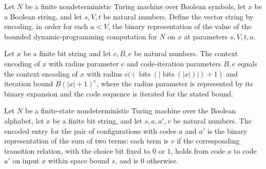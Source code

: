 \begin{definition}
\label{Randomized.BPLInP.vecW}
\leanok
{}
Let $N$ be a finite nondeterministic Turing machine over Boolean symbols, let $x$ be a
Boolean string, and let $s,V,t$ be natural numbers. Define the vector string by
encoding, in order for each $a<V$, the binary representation of the value of the bounded
dynamic-programming computation for $N$ on $x$ at parameters $s,V,t,a$.
\end{definition}

\begin{theorem}
\label{Randomized.BPLInP.ctxW_eq}
\leanok
{}
Let $x$ be a finite bit string and let $c,B,e$ be natural numbers. The context encoding
of $x$ with radius parameter $c$ and code-iteration parameters $B,e$ equals the context
encoding of $x$ with radius $c((\operatorname{bits}( |\operatorname{bits}(|x|)|)+1)$ and
iteration bound $B(|x|+1)^e$, where the radius parameter is represented by its binary
expansion and the code sequence is iterated for the stated bound.
\end{theorem}

\begin{theorem}
\label{Randomized.BPLInP.entryW_eq}
\leanok
{}
Let $N$ be a finite-state nondeterministic Turing machine over the Boolean alphabet, let
$x$ be a finite bit string, and let $s,a,a',v$ be natural numbers. The encoded entry for
the pair of configurations with codes $a$ and $a'$ is the binary representation of the
sum of two terms: each term is $v$ if the corresponding transition relation, with the
choice bit fixed to $0$ or $1$, holds from code $a$ to code $a'$ on input $x$ within
space bound $s$, and is $0$ otherwise.
\end{theorem}

